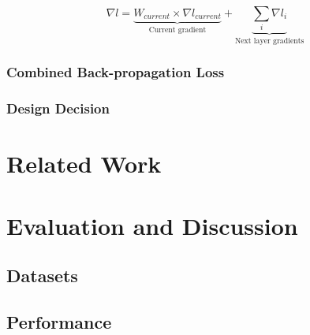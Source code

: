 \documentclass[conference]{IEEEtran}
\begin{document}
\[
\nabla l = \underbrace{W_{current} \times \nabla l_{current}}_{\text{Current gradient}} + \underbrace{\sum_{i}^{} \nabla l_{i}}_{\text{Next layer gradients}}
\]

\subsubsection{Combined Back-propagation Loss}

\subsubsection{Design Decision}






\section{Related Work}

\section{Evaluation and Discussion}
\subsection{Datasets}

\subsection{Performance}
\end{document}
